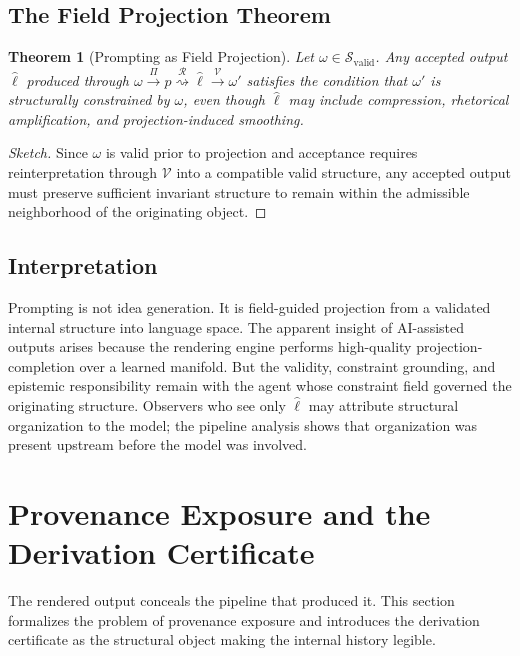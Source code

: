 \documentclass[12pt, a4paper]{article}
\newcommand{\xrightsquigarrow}[1]{%
  \mathrel{\overset{#1}{\rightsquigarrow}}%
}
\theoremstyle{plain}
\newtheorem{theorem}{Theorem}[section]
\theoremstyle{definition}
\theoremstyle{remark}
\begin{document}
\subsection{The Field Projection Theorem}

\begin{theorem}[Prompting as Field Projection]
\label{thm:prompting}
Let $\omega \in \mathcal{S}_{\mathrm{valid}}$. Any accepted output $\hat{\ell}$ produced through $\omega \xrightarrow{\Pi} p \xrightsquigarrow{\mathcal{R}} \hat{\ell} \xrightarrow{\mathcal{V}} \omega'$ satisfies the condition that $\omega'$ is structurally constrained by $\omega$, even though $\hat{\ell}$ may include compression, rhetorical amplification, and projection-induced smoothing.
\end{theorem}

\begin{proof}[Sketch]
Since $\omega$ is valid prior to projection and acceptance requires reinterpretation through $\mathcal{V}$ into a compatible valid structure, any accepted output must preserve sufficient invariant structure to remain within the admissible neighborhood of the originating object.
\end{proof}

\subsection{Interpretation}

Prompting is not idea generation. It is field-guided projection from a validated internal structure into language space. The apparent insight of AI-assisted outputs arises because the rendering engine performs high-quality projection-completion over a learned manifold. But the validity, constraint grounding, and epistemic responsibility remain with the agent whose constraint field governed the originating structure. Observers who see only $\hat{\ell}$ may attribute structural organization to the model; the pipeline analysis shows that organization was present upstream before the model was involved.

\section{Provenance Exposure and the Derivation Certificate}

The rendered output conceals the pipeline that produced it. This section formalizes the problem of provenance exposure and introduces the derivation certificate as the structural object making the internal history legible.
\end{document}
